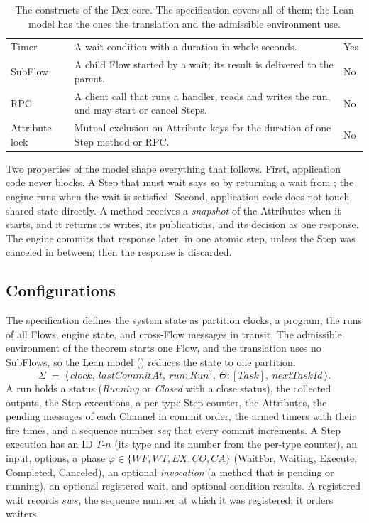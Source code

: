 \begin{table}[t]
\begin{tabularx}{\textwidth}{@{}P{2.5cm}LP{2.6cm}@{}}
Timer & A wait condition with a duration in whole seconds. & Yes \\
SubFlow & A child Flow started by a wait; its result is delivered to the
  parent. & No \\
RPC & A client call that runs a handler, reads and writes the run, and may
  start or cancel Steps. & No \\
Attribute lock & Mutual exclusion on Attribute keys for the duration of one
  Step method or RPC. & No \\
\bottomrule
\end{tabularx}
\caption{The constructs of the Dex core. The specification covers all of
them; the Lean model has the ones the translation and the admissible
environment use.}
\label{tab:constructs}
\end{table}

Two properties of the model shape everything that follows. First,
application code never blocks. A Step that must wait says so by returning a
wait from ; the engine runs  when the wait is
satisfied. Second, application code does not touch shared state directly. A
method receives a \emph{snapshot} of the Attributes when it starts, and it
returns its writes, its publications, and its decision as one response.
The engine commits that response later, in one atomic step, unless the
Step was canceled in between; then the response is discarded.

\subsection{Configurations}
\label{sec:dex-config}

The specification defines the system state as partition clocks, a program,
the runs of all Flows, engine state, and cross-Flow messages in transit. The
admissible environment of the theorem starts one Flow, and the translation
uses no SubFlows, so the Lean model () reduces the
state to one partition:
\[
\Sigma \;=\; \langle\, \mathit{clock},\ \mathit{lastCommitAt},\
\mathit{run} : \mathit{Run}^{?},\ \Theta : [\mathit{Task}],\
\mathit{nextTaskId} \,\rangle .
\]
A run holds a status (\emph{Running} or \emph{Closed} with a close status),
the collected outputs, the Step executions, a per-type Step counter, the
Attributes, the pending messages of each Channel in commit order, the armed
timers with their fire times, and a sequence number $\mathit{seq}$ that
every commit increments. A Step execution has an ID $T\text{-}n$ (its type
and its number from the per-type counter), an input, options, a phase
$\varphi \in \{\mathit{WF}, \mathit{WT}, \mathit{EX}, \mathit{CO},
\mathit{CA}\}$ (WaitFor, Waiting, Execute, Completed, Canceled), an optional
\emph{invocation} (a method that is pending or running), an optional
registered wait, and optional condition results. A registered wait records
$\mathit{sws}$, the sequence number at which it was registered; it orders
waiters.

